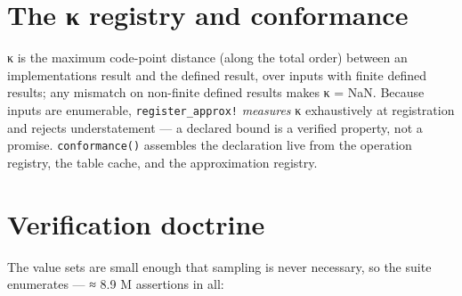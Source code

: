 \section{The κ registry and conformance}



\label{9937209558637538978}{}


κ is the maximum code-point distance (along the total order) between an implementation{\textquotesingle}s result and the defined result, over inputs with finite defined results; any mismatch on non-finite defined results makes κ = NaN. Because inputs are enumerable, \texttt{register\_approx!} \emph{measures} κ exhaustively at registration and rejects understatement — a declared bound is a verified property, not a promise. \texttt{conformance()} assembles the declaration live from the operation registry, the table cache, and the approximation registry.



\section{Verification doctrine}



\label{12691031809522550080}{}


The value sets are small enough that sampling is never necessary, so the suite enumerates — ≈ 8.9 M assertions in all:




